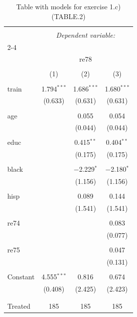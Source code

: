 
\begin{table}[!htbp] \centering 
  \caption{Table with models for exercise 1.c) (TABLE.2)} 
  \label{} 
\begin{tabular}{@{\extracolsep{5pt}}lccc} 
\\[-1.8ex]\hline 
\hline \\[-1.8ex] 
 & \multicolumn{3}{c}{\textit{Dependent variable:}} \\ 
\cline{2-4} 
\\[-1.8ex] & \multicolumn{3}{c}{re78} \\ 
\\[-1.8ex] & (1) & (2) & (3)\\ 
\hline \\[-1.8ex] 
 train & 1.794$^{***}$ & 1.686$^{***}$ & 1.680$^{***}$ \\ 
  & (0.633) & (0.631) & (0.631) \\ 
  & & & \\ 
 age &  & 0.055 & 0.054 \\ 
  &  & (0.044) & (0.044) \\ 
  & & & \\ 
 educ &  & 0.415$^{**}$ & 0.404$^{**}$ \\ 
  &  & (0.175) & (0.175) \\ 
  & & & \\ 
 black &  & $-$2.229$^{*}$ & $-$2.180$^{*}$ \\ 
  &  & (1.156) & (1.156) \\ 
  & & & \\ 
 hisp &  & 0.089 & 0.144 \\ 
  &  & (1.541) & (1.541) \\ 
  & & & \\ 
 re74 &  &  & 0.083 \\ 
  &  &  & (0.077) \\ 
  & & & \\ 
 re75 &  &  & 0.047 \\ 
  &  &  & (0.131) \\ 
  & & & \\ 
 Constant & 4.555$^{***}$ & 0.816 & 0.674 \\ 
  & (0.408) & (2.425) & (2.423) \\ 
  & & & \\ 
\hline \\[-1.8ex] 
Treated & 185 & 185 & 185 \\ 

\end{tabular}
\end{table}

